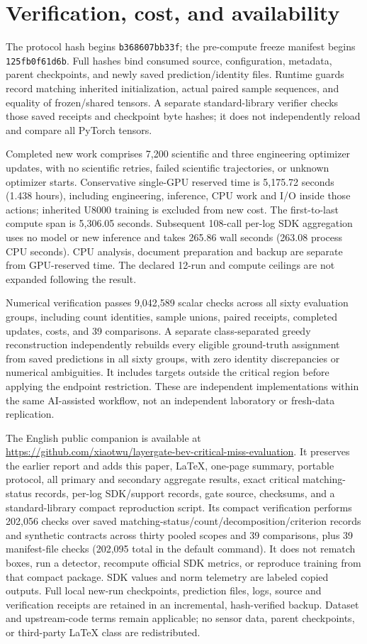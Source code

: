 \section{Verification, cost, and availability}
The protocol hash begins \texttt{b368607bb33f}; the pre-compute freeze manifest begins \texttt{125fb0f61d6b}. Full hashes bind consumed source, configuration, metadata, parent checkpoints, and newly saved prediction/identity files. Runtime guards record matching inherited initialization, actual paired sample sequences, and equality of frozen/shared tensors. A separate standard-library verifier checks those saved receipts and checkpoint byte hashes; it does not independently reload and compare all PyTorch tensors.

Completed new work comprises 7,200 scientific and three engineering optimizer updates, with no scientific retries, failed scientific trajectories, or unknown optimizer starts. Conservative single-GPU reserved time is 5,175.72 seconds (1.438 hours), including engineering, inference, CPU work and I/O inside those actions; inherited U8000 training is excluded from new cost. The first-to-last compute span is 5,306.05 seconds. Subsequent 108-call per-log SDK aggregation uses no model or new inference and takes 265.86 wall seconds (263.08 process CPU seconds). CPU analysis, document preparation and backup are separate from GPU-reserved time. The declared 12-run and compute ceilings are not expanded following the result.

Numerical verification passes 9,042,589 scalar checks across all sixty evaluation groups, including count identities, sample unions, paired receipts, completed updates, costs, and 39 comparisons. A separate class-separated greedy reconstruction independently rebuilds every eligible ground-truth assignment from saved predictions in all sixty groups, with zero identity discrepancies or numerical ambiguities. It includes targets outside the critical region before applying the endpoint restriction. These are independent implementations within the same AI-assisted workflow, not an independent laboratory or fresh-data replication.

The English public companion is available at \url{https://github.com/xiaotwu/layergate-bev-critical-miss-evaluation}. It preserves the earlier report and adds this paper, LaTeX, one-page summary, portable protocol, all primary and secondary aggregate results, exact critical matching-status records, per-log SDK/support records, gate source, checksums, and a standard-library compact reproduction script. Its compact verification performs 202,056 checks over saved matching-status/count/decomposition/criterion records and synthetic contracts across thirty pooled scopes and 39 comparisons, plus 39 manifest-file checks (202,095 total in the default command). It does not rematch boxes, run a detector, recompute official SDK metrics, or reproduce training from that compact package. SDK values and norm telemetry are labeled copied outputs. Full local new-run checkpoints, prediction files, logs, source and verification receipts are retained in an incremental, hash-verified backup. Dataset and upstream-code terms remain applicable; no sensor data, parent checkpoints, or third-party LaTeX class are redistributed.
